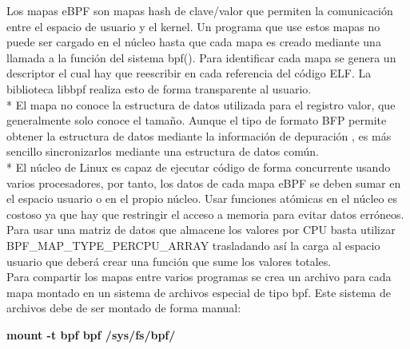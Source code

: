 Los mapas eBPF son mapas hash de clave/valor que permiten la comunicación entre el espacio de usuario y el kernel. Un programa que use estos mapas no puede ser cargado en el núcleo hasta que cada mapa es creado mediante una llamada a la función del sistema bpf(). Para identificar cada mapa se genera un descriptor el cual hay que reescribir en cada referencia del código ELF. La biblioteca libbpf realiza esto de forma transparente al usuario. \\*
El mapa no conoce la estructura de datos utilizada para el registro valor, que generalmente solo conoce el tamaño. Aunque el tipo de formato BFP permite obtener la estructura de datos mediante la información de depuración \cite{BTF}, es más sencillo sincronizarlos mediante una estructura de datos común. \\*
El núcleo de Linux es capaz de ejecutar código de forma concurrente usando varios procesadores, por tanto, los datos de cada mapa eBPF se deben sumar en el espacio usuario o en el propio núcleo. Usar funciones atómicas en el núcleo es costoso ya que hay que restringir el acceso a memoria para evitar datos erróneos. Para usar una matriz de datos que almacene los valores por CPU basta utilizar BPF\_MAP\_TYPE\_PERCPU\_ARRAY trasladando así la carga al espacio usuario que deberá crear una función que sume los valores totales. \\
Para compartir los mapas entre varios programas se crea un archivo para cada mapa montado en un sistema de archivos especial de tipo bpf. Este sistema de archivos debe de ser montado de forma manual:

\begin{center}
    \textbf{mount -t bpf bpf /sys/fs/bpf/}
\end{center}



\clearpage